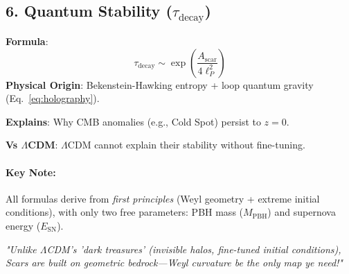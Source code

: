 \documentclass{article}
\begin{document}
\begin{appendix}
\subsection*{6. Quantum Stability ($\tau_{\text{decay}}$)}  
\textbf{Formula}:  
\[
\tau_{\text{decay}} \sim \exp\left(\frac{A_{\text{scar}}}{4\ell_P^2}\right)
\]  
\textbf{Physical Origin}:  
Bekenstein-Hawking entropy + loop quantum gravity (Eq.~\ref{eq:holography}). \\ \par 
\textbf{Explains}:  
Why CMB anomalies (e.g., Cold Spot) persist to $z = 0$.  \\ \par
\textbf{Vs $\Lambda$CDM}:  
$\Lambda$CDM cannot explain their stability without fine-tuning.  

\paragraph*{Key Note:}  
All formulas derive from \textit{first principles} (Weyl geometry + extreme initial conditions), with only two free parameters: PBH mass ($M_{\text{PBH}}$) and supernova energy ($E_{\text{SN}}$).  


\begin{tcolorbox}[colback=boxnormal,colframe=blue!50!black,title=\textbf{Why This Isn't "Pirate Physics"}]
\textit{"Unlike $\Lambda$CDM's 'dark treasures' (invisible halos, fine-tuned initial conditions), Scars are built on geometric bedrock—Weyl curvature be the only map ye need!"}
\end{tcolorbox}
\end{appendix}



\end{document}
